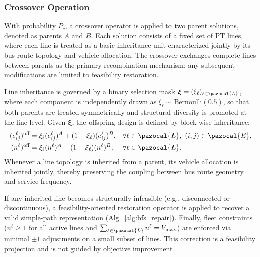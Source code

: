\documentclass[a4paper,fleqn]{cas-sc}
\begin{document}
\subsubsection{Crossover Operation}\label{sec:crossover}

With probability $P_c$, a crossover operator is applied to two parent solutions, denoted as parents $A$ and $B$.
Each solution consists of a fixed set of PT lines, where each line is treated as a basic inheritance unit characterized jointly by its bus route topology and vehicle allocation.
The crossover exchanges complete lines between parents as the primary recombination mechanism; any subsequent modifications are limited to feasibility restoration.

Line inheritance is governed by a binary selection mask $\boldsymbol{\xi}=(\xi_\ell)_{\ell\in\pazocal{L}}$, where each component is independently drawn as $\xi_\ell \sim \mathrm{Bernoulli}(0.5)$,
so that both parents are treated symmetrically and structural diversity is promoted at the line level.
%
Given $\boldsymbol{\xi}$, the offspring design is defined by block-wise inheritance:
\begin{align}
(e_{ij}^\ell)^{\text{off}}
&=
\xi_\ell (e_{ij}^\ell)^{A} + (1-\xi_\ell)(e_{ij}^\ell)^{B},
&& \forall \ell\in\pazocal{L},\ (i,j)\in\pazocal{E},
\label{eq:crossover_edges}\\
(n^\ell)^{\text{off}}
&=
\xi_\ell (n^\ell)^{A} + (1-\xi_\ell)(n^\ell)^{B},
&& \forall \ell\in\pazocal{L}.
\label{eq:crossover_fleet}
\end{align}
Whenever a line topology is inherited from a parent, its vehicle allocation is inherited jointly, thereby preserving the coupling between bus route geometry and service frequency.

If any inherited line becomes structurally infeasible (e.g., disconnected or discontinuous), a feasibility-oriented restoration operator is applied to recover a valid simple-path representation (Alg.~\ref{alg:bfs_repair}).
%
Finally, fleet constraints ($n^\ell \ge 1$ for all active lines and $\sum_{\ell\in\pazocal{L}} n^\ell = V_{\max}$) are enforced via minimal $\pm 1$ adjustments on a small subset of lines.
This correction is a feasibility projection and is not guided by objective improvement.
\end{document}
